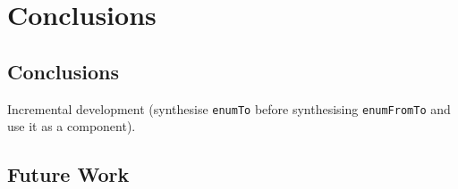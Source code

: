 \chapter{Conclusions} \label{conclusions}

\section{Conclusions}
Incremental development (synthesise \lstinline?enumTo? before synthesising \lstinline?enumFromTo? and use it as a component).
  
\section{Future Work}


